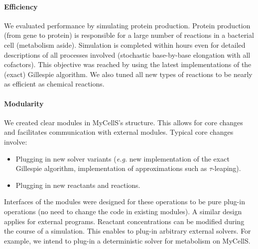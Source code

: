 \paragraph{Efficiency}
We evaluated performance by simulating protein production.
Protein production (from gene to protein) is responsible for
a large number of reactions in a bacterial cell (metabolism aside).
Simulation is completed within hours even for detailed descriptions of all
processes involved (stochastic base-by-base elongation with all cofactors).
This objective was reached by using the latest implementations
of the (exact) Gillespie algorithm.
We also tuned all new types of reactions to be nearly as efficient as chemical
reactions.

\paragraph{Modularity}
We created clear modules in MyCellS's structure.
This allows for core changes and facilitates communication with external modules.
Typical core changes involve:
\begin{itemize}
  \item Plugging in new solver variants
  (\textit{e.g.} new implementation of the  exact Gillespie algorithm,
  implementation of approximations such as $\tau$-leaping).
  \item Plugging in new reactants and reactions.
\end{itemize}
Interfaces of the modules were designed for these operations to be pure
plug-in operations (no need to change the code in existing modules).
A similar design applies for external programs.
Reactant concentrations can be modified during the course of a simulation.
This enables to plug-in arbitrary external solvers.
For example, we intend to plug-in a deterministic solver for metabolism on
MyCellS.
